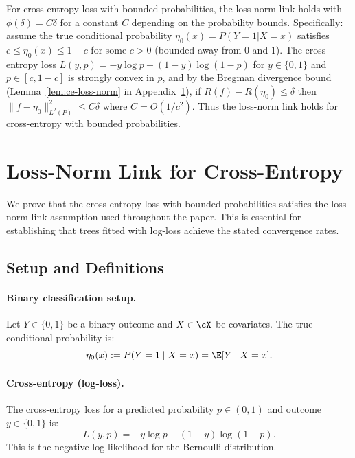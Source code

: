 


For cross-entropy loss with bounded probabilities, the loss-norm link holds with $\phi(\delta) = C\delta$ for a constant $C$ depending on the probability bounds. Specifically: assume the true conditional probability $\eta_0(x) = P(Y=1|X=x)$ satisfies $c \le \eta_0(x) \le 1-c$ for some $c > 0$ (bounded away from 0 and 1). The cross-entropy loss $L(y, p) = -y \log p - (1-y) \log(1-p)$ for $y \in \{0,1\}$ and $p \in [c, 1-c]$ is strongly convex in $p$, and by the Bregman divergence bound (Lemma~\ref{lem:ce-loss-norm} in Appendix~\ref{app:loss-norm}), if $R(f) - R(\eta_0) \le \delta$ then $\|f - \eta_0\|_{L^2(P)}^2 \le C\delta$ where $C = O(1/c^2)$. Thus the loss-norm link holds for cross-entropy with bounded probabilities.



\section{Loss-Norm Link for Cross-Entropy}
\label{app:loss-norm}

We prove that the cross-entropy loss with bounded probabilities satisfies the loss-norm link assumption used throughout the paper. This is essential for establishing that trees fitted with log-loss achieve the stated convergence rates.

\subsection{Setup and Definitions}

\paragraph{Binary classification setup.}
Let $Y \in \{0,1\}$ be a binary outcome and $X \in \cX$ be covariates. The true conditional probability is:
\[
\eta_0(x) := P(Y = 1 \mid X = x) = \E[Y \mid X = x].
\]

\paragraph{Cross-entropy (log-loss).}
The cross-entropy loss for a predicted probability $p \in (0,1)$ and outcome $y \in \{0,1\}$ is:
\[
L(y, p) = -y \log p - (1-y) \log(1-p).
\]
This is the negative log-likelihood for the Bernoulli distribution.

